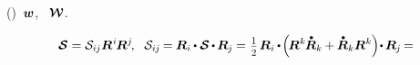 \vspace{-0.1em} \noindent {}  ()~${\bm{w}}$, ~${\vorticitytensor}$.

  

\nopagebreak\vspace{-0.66em}\begin{multline*}
\strainratetensor = \strainratetensorcomponents{i\hspace{-0.1ex}j} \bm{R}^{\hspace{.1ex}i} \hspace{-0.2ex} \bm{R}^j
\hspace{-0.3ex} , \hspace{.6em}
\strainratetensorcomponents{i\hspace{-0.1ex}j} \hspace{-0.2ex}
= \hspace{-0.1ex} \bm{R}_i \hspace{-0.1ex} \dotp \strainratetensor \hspace{-0.15ex} \dotp \hspace{-0.15ex} \bm{R}_{\hspace{-0.1ex}j} \hspace{-0.1ex}
= \hspace{.1ex} \smalldisplaystyleonehalf \hspace{.25ex} \bm{R}_i \hspace{-0.1ex} \dotp \hspace{-0.25ex} \left( \hspace{-0.25ex} \bm{R}^{\hspace{.05ex}k} \hspace{-0.2ex} \mathdotabove{\bm{R}}_k \hspace{-0.1ex} + \hspace{-0.1ex} \mathdotabove{\bm{R}}_k \bm{R}^{\hspace{.05ex}k} \hspace{-0.1ex} \right) \hspace{-0.4ex} \dotp \hspace{-0.15ex} \bm{R}_{\hspace{-0.1ex}j} \hspace{-0.2ex}
=
\\[-0.3em]
\shoveright{ \hfill \hspace{12em}
}
\end{multline*}
